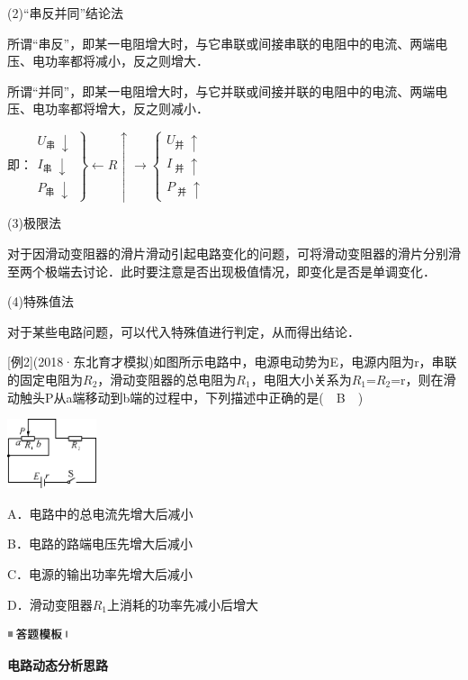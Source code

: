 \documentclass[cn,10.5pt,chinese,mac,chinesefont=founder]{elegantbook}
\begin{document}
(2)``串反并同''结论法

所谓``串反''，即某一电阻增大时，与它串联或间接串联的电阻中的电流、两端电压、电功率都将减小，反之则增大．

所谓``并同''，即某一电阻增大时，与它并联或间接并联的电阻中的电流、两端电压、电功率都将增大，反之则减小．

即：$\left.\begin{array}{l}U_{\text {串 }} \downarrow \\ I_{\text {串 }} \downarrow \\ P_{\text {串 }}\downarrow\end{array}\right\} \leftarrow R \uparrow \rightarrow\left\{\begin{array}{l}U_{\text {并 }} \uparrow \\ I_ \text { 并 } \uparrow \\ P_\text { 并 }{\uparrow}\end{array}\right.$

(3)极限法

对于因滑动变阻器的滑片滑动引起电路变化的问题，可将滑动变阻器的滑片分别滑至两个极端去讨论．此时要注意是否出现极值情况，即变化是否是单调变化．

(4)特殊值法

对于某些电路问题，可以代入特殊值进行判定，从而得出结论．

{[}例2{]}(2018·东北育才模拟)如图所示电路中，电源电动势为E，电源内阻为r，串联的固定电阻为$R_2$，滑动变阻器的总电阻为$R_1$，电阻大小关系为$R_1$=$R_2$=r，则在滑动触头P从a端移动到b端的过程中，下列描述中正确的是(　B　)

\begin{center}\includegraphics[width=1.02847in,height=0.80208in]{media/image322.png}\end{center}

A．电路中的总电流先增大后减小

B．电路的路端电压先增大后减小

C．电源的输出功率先增大后减小

D．滑动变阻器$R_1$上消耗的功率先减小后增大

\begin{center}\includegraphics[width=0.70764in,height=0.12292in]{media/image25.png}\end{center}
\begin{center}
	\textbf{电路动态分析思路}
\end{center}
\end{document}
